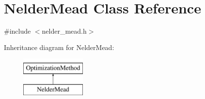 \hypertarget{class_nelder_mead}{}\section{Nelder\+Mead Class Reference}
\label{class_nelder_mead}


{\ttfamily \#include $<$nelder\+\_\+mead.\+h$>$}

Inheritance diagram for Nelder\+Mead\+:\begin{figure}[H]
\begin{center}
\leavevmode
\includegraphics[height=2.000000cm]{class_nelder_mead}
\end{center}
\end{figure}
